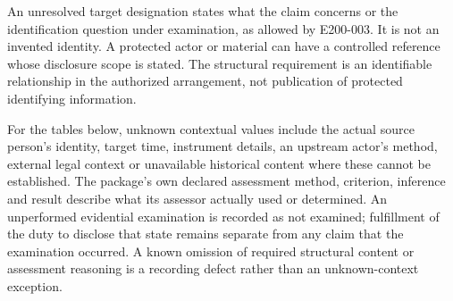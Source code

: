 \documentclass[11pt,a4paper]{article}
\begin{document}

An unresolved target designation states what the claim concerns or the identification question under examination, as allowed by E200-003. It is not an invented identity. A protected actor or material can have a controlled reference whose disclosure scope is stated. The structural requirement is an identifiable relationship in the authorized arrangement, not publication of protected identifying information.

For the tables below, unknown contextual values include the actual source person's identity, target time, instrument details, an upstream actor's method, external legal context or unavailable historical content where these cannot be established. The package's own declared assessment method, criterion, inference and result describe what its assessor actually used or determined. An unperformed evidential examination is recorded as not examined; fulfillment of the duty to disclose that state remains separate from any claim that the examination occurred. A known omission of required structural content or assessment reasoning is a recording defect rather than an unknown-context exception.
\end{document}
